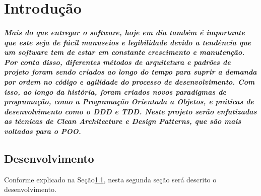 \chapter{\thechapter \hspace{3mm} Introdução} \label{cap:introduction}

\paragraph{Mais do que entregar o software, hoje em dia também é importante que este seja de fácil manuseios e legibilidade devido a tendência que um software tem de estar em constante crescimento e manutenção. Por conta disso, diferentes métodos de arquitetura e padrões de projeto foram sendo criados ao longo do tempo para suprir a demanda por ordem no código e agilidade do processo de desenvolvimento.
Com isso, ao longo da história, foram criados novos paradigmas de programação, como a Programação Orientada a Objetos, e práticas de desenvolvimento como o DDD e TDD.
Neste projeto serão enfatizadas as técnicas de \emph{Clean Architecture} e \emph{Design Patterns}, que são mais voltadas para o POO.}

\section{Desenvolvimento}\label{sec:desenv}

Conforme explicado na Seção\ref{sec:desenv}, nesta segunda seção será descrito o desenvolvimento.